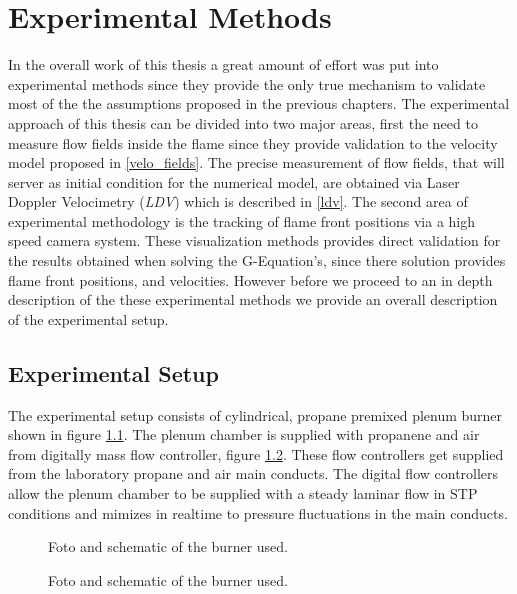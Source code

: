 \chapter{Experimental Methods}

In the overall work of this thesis a great amount of effort was put into
experimental methods since they provide the only true mechanism to validate
most of the the assumptions proposed in the previous chapters.
The experimental approach of this thesis can be divided into two major areas,
first the need to measure flow fields inside the flame since they provide
validation to the velocity model proposed in \ref{velo_fields}. The precise
measurement of flow fields, that will server as initial condition for the
numerical model, are obtained via Laser Doppler Velocimetry (\emph{LDV}) which
is described in \ref{ldv}.
The second area of experimental methodology is the tracking of flame front
positions via a high speed camera system. These visualization methods provides
direct validation for the results obtained when solving the G-Equation's, since
there solution provides flame front positions, and velocities.
However before we proceed to an in depth description of the these experimental
methods we provide an overall description of the experimental setup.

\section{Experimental Setup}
The experimental setup consists of cylindrical, propane premixed plenum burner
shown in figure \ref{fig:burner}. The plenum chamber is supplied with propanene and air
from digitally mass flow controller, figure \ref{fig:flowmeter}. These flow controllers get 
supplied from the laboratory propane and air main conducts. The digital flow controllers allow the 
plenum chamber to be supplied with a steady laminar flow in STP conditions and mimizes in realtime 
to pressure fluctuations in the main conducts.

\begin{figure}[!htb]
	\begin{subfigmatrix}{1}
	\end{subfigmatrix}
	\caption{Foto and schematic of the burner used.}
	\label{fig:burner}
\end{figure}


\begin{figure}[!htb]
	\begin{subfigmatrix}{1}
	\end{subfigmatrix}
	\caption{Foto and schematic of the burner used.}
	\label{fig:flowmeter}
\end{figure}




